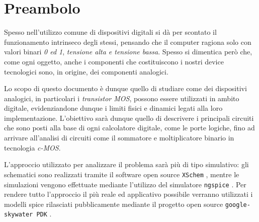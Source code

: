 \chapter{Preambolo}
	Spesso nell'utilizzo comune di dispositivi digitali si dà per scontato il funzionamento intrinseco degli stessi, pensando che il computer ragiona solo con valori binari \textit{0 ed 1}, \textit{tensione alta e tensione bassa}. Spesso si dimentica però che, come ogni oggetto, anche i componenti che costituiscono i nostri device tecnologici sono, in origine, dei componenti analogici.
	
	Lo scopo di questo documento è dunque quello di studiare come dei dispositivi analogici, in particolari i \textit{transistor MOS}, possono essere utilizzati in ambito digitale, evidenziandone dunque i limiti fisici e dinamici legati alla loro implementazione. L'obiettivo sarà dunque quello di descrivere i principali circuiti che sono posti alla base di ogni calcolatore digitale, come le porte logiche, fino ad arrivare all'analisi di circuiti come il sommatore e moltiplicatore binario in tecnologia \textit{c-MOS}.
	
	L'approccio utilizzato per analizzare il problema sarà più di tipo simulativo: gli schematici sono realizzati tramite il software open source \texttt{XSchem} \cite{xschem}, mentre le simulazioni vengono effettuate mediante l'utilizzo del simulatore \texttt{ngspice} \cite{ngspice}. Per rendere tutto l'approccio il più reale ed applicativo possibile verranno utilizzati i modelli spice rilasciati pubblicamente mediante il progetto open source \texttt{google-skywater PDK} \cite{skywater}.
